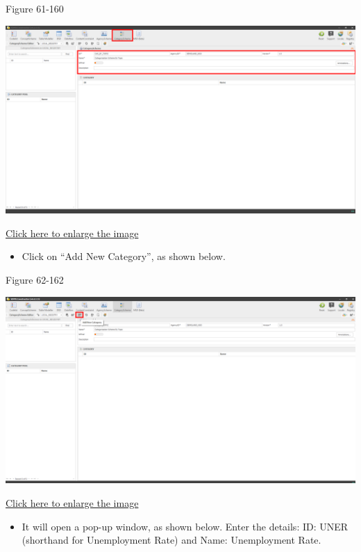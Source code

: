 \documentclass[
]{book}
\providecommand{\tightlist}{%
  \setlength{\itemsep}{0pt}\setlength{\parskip}{0pt}}
\theoremstyle{definition}
\theoremstyle{definition}
\theoremstyle{definition}
\theoremstyle{definition}
\theoremstyle{remark}
\begin{document}
Figure 61-160

\begin{center}\includegraphics[width=1\linewidth]{./images/image160} \end{center}

\href{images/image160.png}{Click here to enlarge the image}

\begin{itemize}
\tightlist
\item
  Click on ``Add New Category'', as shown below.
\end{itemize}

Figure 62-162

\begin{center}\includegraphics[width=1\linewidth]{./images/image162} \end{center}

\href{images/image162.png}{Click here to enlarge the image}

\begin{itemize}
\tightlist
\item
  It will open a pop-up window, as shown below. Enter the details: ID: UNER (shorthand for Unemployment Rate) and Name: Unemployment Rate.
\end{itemize}
\end{document}

